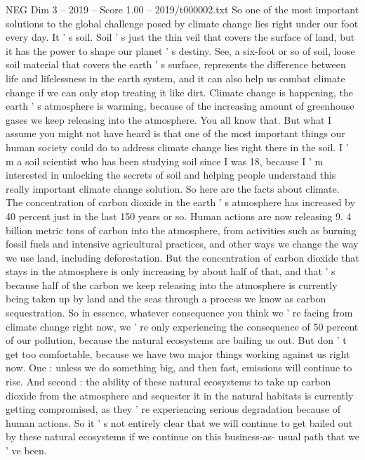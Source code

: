 \begin{textsample}{NEG Dim 3 – 2019 – Score 1.00 – 2019/t000002.txt}  \label{ex:f3_neg_077}
So one of the most important solutions to the global challenge posed by climate change lies right under our foot every day.
It ' s soil.
Soil ' s just the thin veil that covers the surface of land, but it has the power to shape our planet ' s destiny.
See, a six-foot or so of soil, loose soil material that covers the earth ' s surface, represents the difference between life and lifelessness in the earth system, and it can also help us combat climate change if we can only stop treating it like dirt.
Climate change is happening, the earth ' s atmosphere is warming, because of the increasing amount of greenhouse gases we keep releasing into the atmosphere.
You all know that.
But what I assume you might not have heard is that one of the most important things our human society could do to address climate change lies right there in the soil.
I ' m a soil scientist who has been studying soil since I was 18, because I ' m interested in unlocking the secrets of soil and helping people understand this really important climate change solution.
So here are the facts about climate.
The concentration of carbon dioxide in the earth ' s atmosphere has increased by 40 percent just in the last 150 years or so.
Human actions are now releasing 9. 4 billion metric tons of carbon into the atmosphere, from activities such as burning fossil fuels and intensive agricultural practices, and other ways we change the way we use land, including deforestation.
But the concentration of carbon dioxide that stays in the atmosphere is only increasing by about half of that, and that ' s because half of the carbon we keep releasing into the atmosphere is currently being taken up by land and the seas through a process we know as carbon sequestration.
So in essence, whatever consequence you think we ' re facing from climate change right now, we ' re only experiencing the consequence of 50 percent of our pollution, because the natural ecosystems are bailing us out.
But don ' t get too comfortable, because we have two major things working against us right now.
One : unless we do something big, and then fast, emissions will continue to rise.
And second : the ability of these natural ecosystems to take up carbon dioxide from the atmosphere and sequester it in the natural habitats is currently getting compromised, as they ' re experiencing serious degradation because of human actions.
So it ' s not entirely clear that we will continue to get bailed out by these natural ecosystems if we continue on this business-as- usual path that we ' ve been.

\end{textsample}
